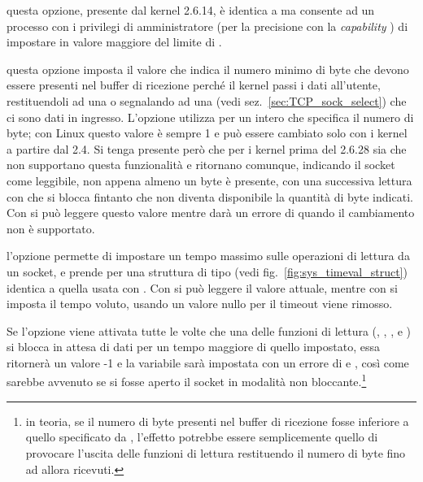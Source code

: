 \begin{basedescript}{\desclabelwidth{2.2cm}\desclabelstyle{\nextlinelabel}}
\item[\constd{SO\_RCVBUFFORCE}] questa opzione, presente dal kernel 2.6.14, è
  identica a  ma consente ad un processo con i privilegi di
  amministratore (per la precisione con la \textit{capability}
  ) di impostare in valore maggiore del limite di
  .

\item[\constd{SO\_RCVLOWAT}] questa opzione imposta il valore che indica il
  numero minimo di byte che devono essere presenti nel buffer di ricezione
  perché il kernel passi i dati all'utente, restituendoli ad una  o
  segnalando ad una  (vedi sez.~\ref{sec:TCP_sock_select}) che ci
  sono dati in ingresso. L'opzione utilizza per  un intero che
  specifica il numero di byte; con Linux questo valore è sempre 1 e può essere
  cambiato solo con i kernel a partire dal 2.4. Si tenga presente però che per
  i kernel prima del 2.6.28 sia  che  non supportano
  questa funzionalità e ritornano comunque, indicando il socket come
  leggibile, non appena almeno un byte è presente, con una successiva lettura
  con  che si blocca fintanto che non diventa disponibile la
  quantità di byte indicati. Con  si può leggere questo
  valore mentre  darà un errore di 
  quando il cambiamento non è supportato.

\item[\constd{SO\_RCVTIMEO}] l'opzione permette di impostare un tempo massimo
  sulle operazioni di lettura da un socket, e prende per  una
  struttura di tipo  (vedi fig.~\ref{fig:sys_timeval_struct})
  identica a quella usata con . Con  si può
  leggere il valore attuale, mentre con  si imposta il tempo
  voluto, usando un valore nullo per  il timeout viene
  rimosso. 

  Se l'opzione viene attivata tutte le volte che una delle funzioni di lettura
  (, , ,  e )
  si blocca in attesa di dati per un tempo maggiore di quello impostato, essa
  ritornerà un valore -1 e la variabile  sarà impostata con un
  errore di  e , così come sarebbe
  avvenuto se si fosse aperto il socket in modalità non bloccante.\footnote{in
    teoria, se il numero di byte presenti nel buffer di ricezione fosse
    inferiore a quello specificato da , l'effetto potrebbe
    essere semplicemente quello di provocare l'uscita delle funzioni di
    lettura restituendo il numero di byte fino ad allora ricevuti.}


\end{basedescript}
